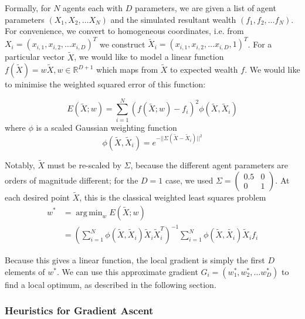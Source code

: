 \documentclass[11pt]{article}
\DeclareMathOperator*{\argmin}{arg\,min}
\begin{document}
Formally, for $N$ agents each with $D$ parameters, we are given a list of agent parameters $(X_1, X_2, \ldots X_N)$ and the simulated resultant wealth $(f_1, f_2, \ldots f_N)$. For convenience, we convert to homogeneous coordinates, i.e. from $X_i = (x_{i,1}, x_{i,2}, \ldots x_{i,D})^T$ we construct $\tilde{X}_i = (x_{i,1}, x_{i,2}, \ldots x_{i,D},  1)^T$. For a particular vector $\tilde{X}$, we would like to model a linear function $f(\tilde{X}) = w \tilde{X}, w \in \mathbb{R}^{D+1}$ which maps from $\tilde{X}$ to expected wealth $f$. We would like to minimise the weighted squared error of this function:

\begin{equation}
E(\tilde{X}; w) = \sum_{i=1}^N (f(\tilde{X}; w) - f_i)^2 \phi(\tilde{X}, \tilde{X}_i)
\end{equation}
where $\phi$ is a scaled Gaussian weighting function
\begin{equation}
\phi(\tilde{X}, \tilde{X}_i) = e^{-||\Sigma (\tilde{X}-\tilde{X}_i)||^2}
\end{equation}

Notably, $\tilde{X}$ must be re-scaled by $\Sigma$, because the different agent parameters are orders of magnitude different; for the $D=1$ case, we used $\Sigma = \left( \begin{smallmatrix} 0.5&0\\0&1 \end{smallmatrix} \right) $. At each desired point $\tilde{X}$, this is the classical weighted least squares problem
\begin{align}
w^{*} &= \argmin_w E(\tilde{X}; w) \\
 &= \left( \sum_{i=1}^N \phi(\tilde{X},\tilde{X}_i) \tilde{X}_i \tilde{X}_i^T \right)^{-1} \sum_{i=1}^N \phi({\tilde{X}, \tilde{X_i}}) \tilde{X}_i f_i
\end{align}

Because this gives a linear function, the local gradient is simply the first $D$ elements of $w^*$. We can use this approximate gradient $G_i = (w^*_1, w^*_2, \ldots w^*_D)$ to find a local optimum, as described in the following section.

\subsubsection{Heuristics for Gradient Ascent}
\end{document}
